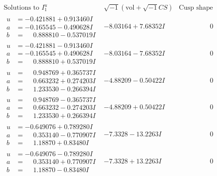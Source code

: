 \documentclass[1p]{elsarticle_modified}
\theoremstyle{definition}
\newcommand{\I}{\sqrt{-1}}
\begin{document}
$$\begin{array}{c|c|c}  
\text{Solutions to }I^u_{1}& \I (\text{vol} + \sqrt{-1}CS) & \text{Cusp shape}\\
 \hline 
\begin{aligned}
u &= -0.421881 + 0.913460 I \\
a &= -0.165545 - 0.490628 I \\
b &= \phantom{-}0.888810 - 0.537019 I\end{aligned}
 & -8.03164 + 7.68352 I & \phantom{-0.000000 } 0 \\ \hline\begin{aligned}
u &= -0.421881 - 0.913460 I \\
a &= -0.165545 + 0.490628 I \\
b &= \phantom{-}0.888810 + 0.537019 I\end{aligned}
 & -8.03164 - 7.68352 I & \phantom{-0.000000 } 0 \\ \hline\begin{aligned}
u &= \phantom{-}0.948769 + 0.365737 I \\
a &= \phantom{-}0.663232 + 0.274203 I \\
b &= \phantom{-}1.233530 - 0.266394 I\end{aligned}
 & -4.88209 - 0.50422 I & \phantom{-0.000000 } 0 \\ \hline\begin{aligned}
u &= \phantom{-}0.948769 - 0.365737 I \\
a &= \phantom{-}0.663232 - 0.274203 I \\
b &= \phantom{-}1.233530 + 0.266394 I\end{aligned}
 & -4.88209 + 0.50422 I & \phantom{-0.000000 } 0 \\ \hline\begin{aligned}
u &= -0.649076 + 0.789280 I \\
a &= \phantom{-}0.353140 - 0.770907 I \\
b &= \phantom{-}1.18870 + 0.83480 I\end{aligned}
 & -7.3328 - 13.2263 I & \phantom{-0.000000 } 0 \\ \hline\begin{aligned}
u &= -0.649076 - 0.789280 I \\
a &= \phantom{-}0.353140 + 0.770907 I \\
b &= \phantom{-}1.18870 - 0.83480 I\end{aligned}
 & -7.3328 + 13.2263 I & \phantom{-0.000000 } 0 \\ \hline\begin{aligned}

\end{aligned}
\end{array}$$
\end{document}
